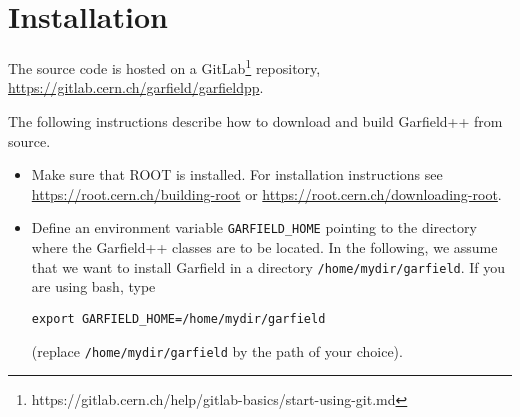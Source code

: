 
\section{Installation}

The source code is hosted on a GitLab\footnote{https://gitlab.cern.ch/help/gitlab-basics/start-using-git.md} repository,
\url{https://gitlab.cern.ch/garfield/garfieldpp}.

The following instructions describe how to download 
and build Garfield++ from source. 
\begin{itemize}
  \item
  Make sure that ROOT is installed. For installation instructions 
  see \url{https://root.cern.ch/building-root} or
  \url{https://root.cern.ch/downloading-root}.
  \item
  Define an environment variable \texttt{GARFIELD\_HOME} 
  pointing to the directory where the Garfield++ classes 
  are to be located.
  In the following, we assume that we want to install Garfield 
  in a directory \texttt{/home/mydir/garfield}.
  If you are using bash, type
  \begin{lstlisting}
export GARFIELD_HOME=/home/mydir/garfield
  \end{lstlisting} 
  (replace \texttt{/home/mydir/garfield} by the path of your choice).
  

\end{itemize}

